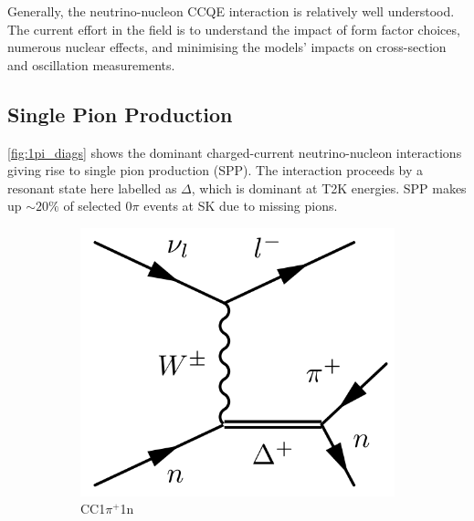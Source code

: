 Generally, the neutrino-nucleon CCQE interaction is relatively well understood. The current effort in the field is to understand the impact of form factor choices, numerous nuclear effects, and minimising the models' impacts on cross-section and oscillation measurements.

\subsection{Single Pion Production}
\autoref{fig:1pi_diags} shows the dominant charged-current neutrino-nucleon interactions giving rise to single pion production (SPP). The interaction proceeds by a resonant state here labelled as $\Delta$, which is dominant at T2K energies. SPP makes up $\sim20\%$ of selected 0$\pi$ events at SK due to missing pions.
\begin{figure}[h]
	\centering
	\begin{subfigure}[t]{0.32\textwidth}
		\includegraphics[width=\textwidth, trim={0mm 0mm 0mm 0mm}, clip,page=1]{figures/niwg/diagrams/CC1npip}
		\caption{CC1$\pi^+$1n}
	\end{subfigure}
	\begin{subfigure}[t]{0.32\textwidth}

\end{subfigure}
\end{figure}
